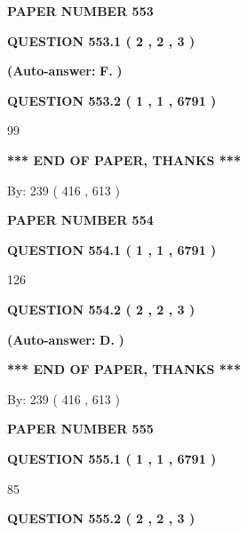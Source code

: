 \documentclass[12pt]{article}
\begin{document}
   
\newpage 
\setcounter{page}{ 
   553001 } 
   
   
 {\textbf{ \Large{ PAPER NUMBER  553  }}}
   
   
   
   
  
  
{\textbf{\large{QUESTION
553.1 
 ( 2 , 2 , 3 )
}}}
 
 
{\textbf{(Auto-answer:}}
{\textbf{\large{
F.}}}
{\textbf{)}}
 
 
  
  
{\textbf{\large{QUESTION
553.2 
 ( 1 , 1 , 6791 )
}}}

99
   
   
   
   
\vspace{1.0in} 
{\textbf{\large{ *** END OF PAPER, THANKS *** }}} 
   
   
\hspace{1.0in} By: 
 239 ( 416 ,  613 )
   
   
   
   
\newpage 
\setcounter{page}{ 
   554001 } 
   
   
 {\textbf{ \Large{ PAPER NUMBER  554  }}}
   
   
   
   
  
  
{\textbf{\large{QUESTION
554.1 
 ( 1 , 1 , 6791 )
}}}

126
  
  
{\textbf{\large{QUESTION
554.2 
 ( 2 , 2 , 3 )
}}}
 
 
{\textbf{(Auto-answer:}}
{\textbf{\large{
D.}}}
{\textbf{)}}
 
 
   
   
   
   
\vspace{1.0in} 
{\textbf{\large{ *** END OF PAPER, THANKS *** }}} 
   
   
\hspace{1.0in} By: 
 239 ( 416 ,  613 )
   
   
   
   
\newpage 
\setcounter{page}{ 
   555001 } 
   
   
 {\textbf{ \Large{ PAPER NUMBER  555  }}}
   
   
   
   
  
  
{\textbf{\large{QUESTION
555.1 
 ( 1 , 1 , 6791 )
}}}

85
  
  
{\textbf{\large{QUESTION
555.2 
 ( 2 , 2 , 3 )
}}}
 
\end{document}

